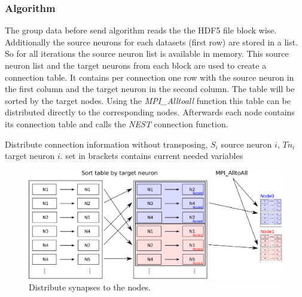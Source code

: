 \documentclass[a4paper]{article}
\begin{document}
\subsubsection{Algorithm}
The group data before send algorithm reads the the HDF5 file block wise.
Additionally the source neurons for each datasets (first row) are stored in a list.
So for all iterations the source neuron list is available in memory.
This source neuron list and the target neurons from each block are used to create a connection table.
It contains per connection one row with the source neuron in the first column and the target neuron in the second column.
The table will be sorted by the target nodes.
Using the \emph{MPI\_Alltoall} function this table can be distributed directly to the corresponding nodes.
Afterwards each node contains its connection table and calls the \emph{NEST} connection function.
\begin{algorithm}
\label{alg2}
\caption{Distribute connection information without transposing, $S_i$ source neuron $i$, $Tn_i$ target neuron $i$.
	set in brackets contains current needed variables}
\end{algorithm}

\begin{figure}[ht!]
\centering
\includegraphics[scale=0.7]{sort_table_all_alltoall.eps}
\caption{Distribute synapses to the nodes.}
\end{figure}
\end{document}
